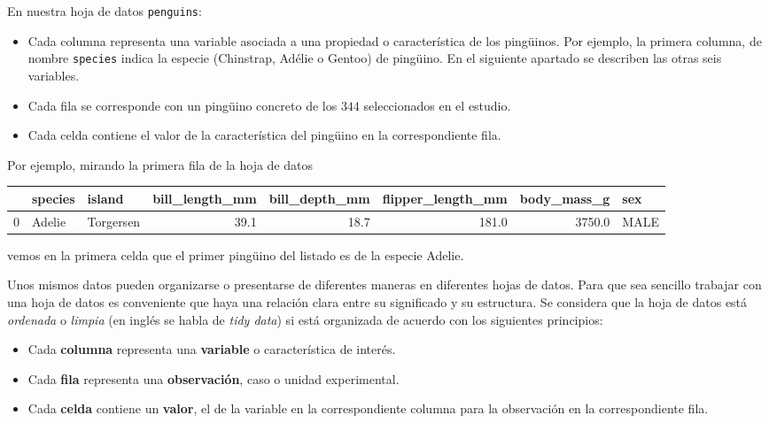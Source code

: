 \documentclass[
  a4paper,
  noprof,
  12pt,
  notoc,
  nosols,
  nobib]{mnye}
\providecommand{\tightlist}{%
  \setlength{\itemsep}{0pt}\setlength{\parskip}{0pt}}\usepackage{longtable,booktabs,array}
\theoremstyle{definition}
\theoremstyle{remark}
\begin{document}
En nuestra hoja de datos \texttt{penguins}:

\begin{itemize}
\item
  Cada columna representa una variable asociada a una propiedad o
  característica de los pingüinos. Por ejemplo, la primera columna, de
  nombre \texttt{species} indica la especie (Chinstrap, Adélie o Gentoo)
  de pingüino. En el siguiente apartado se describen las otras seis
  variables.
\item
  Cada fila se corresponde con un pingüino concreto de los \(344\)
  seleccionados en el estudio.
\item
  Cada celda contiene el valor de la característica del pingüino en la
  correspondiente fila.
\end{itemize}

Por ejemplo, mirando la primera fila de la hoja de datos

\begin{tabular}{lllrrrrl}
\toprule
{} & species &     island &  bill\_length\_mm &  bill\_depth\_mm &  flipper\_length\_mm &  body\_mass\_g &   sex \\
\midrule
0 &  Adelie &  Torgersen &            39.1 &           18.7 &              181.0 &       3750.0 &  MALE \\
\bottomrule
\end{tabular}

vemos en la primera celda que el primer pingüino del listado es de la
especie Adelie.

Unos mismos datos pueden organizarse o presentarse de diferentes maneras
en diferentes hojas de datos. Para que sea sencillo trabajar con una
hoja de datos es conveniente que haya una relación clara entre su
significado y su estructura. Se considera que la hoja de datos está
\emph{ordenada} o \emph{limpia} (en inglés se habla de \emph{tidy data})
si está organizada de acuerdo con los siguientes principios:

\begin{itemize}
\tightlist
\item
  Cada \textbf{columna} representa una \textbf{variable} o
  característica de interés.
\item
  Cada \textbf{fila} representa una \textbf{observación}, caso o unidad
  experimental.
\item
  Cada \textbf{celda} contiene un \textbf{valor}, el de la variable en
  la correspondiente columna para la observación en la correspondiente
  fila.
\end{itemize}
\end{document}
